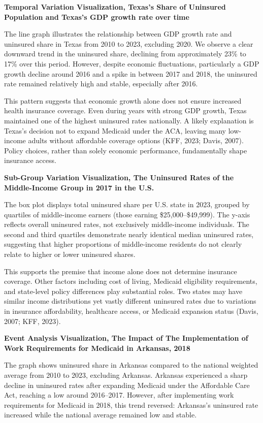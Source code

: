 \documentclass[
]{article}
\begin{document}
\textbf{Temporal Variation Visualization, Texas's Share of Uninsured
Population and Texas's GDP growth rate over time}

The line graph illustrates the relationship between GDP growth rate and
uninsured share in Texas from 2010 to 2023, excluding 2020. We observe a
clear downward trend in the uninsured share, declining from
approximately 23\% to 17\% over this period. However, despite economic
fluctuations, particularly a GDP growth decline around 2016 and a spike
in between 2017 and 2018, the uninsured rate remained relatively high
and stable, especially after 2016.

This pattern suggests that economic growth alone does not ensure
increased health insurance coverage. Even during years with strong GDP
growth, Texas maintained one of the highest uninsured rates nationally.
A likely explanation is Texas's decision not to expand Medicaid under
the ACA, leaving many low-income adults without affordable coverage
options (KFF, 2023; Davis, 2007). Policy choices, rather than solely
economic performance, fundamentally shape insurance access.

\textbf{Sub-Group Variation Visualization, The Uninsured Rates of the
Middle-Income Group in 2017 in the U.S.}

The box plot displays total uninsured share per U.S. state in 2023,
grouped by quartiles of middle-income earners (those earning
\$25,000--\$49,999). The y-axis reflects overall uninsured rates, not
exclusively middle-income individuals. The second and third quartiles
demonstrate nearly identical median uninsured rates, suggesting that
higher proportions of middle-income residents do not clearly relate to
higher or lower uninsured shares.

This supports the premise that income alone does not determine insurance
coverage. Other factors including cost of living, Medicaid eligibility
requirements, and state-level policy differences play substantial roles.
Two states may have similar income distributions yet vastly different
uninsured rates due to variations in insurance affordability, healthcare
access, or Medicaid expansion status (Davis, 2007; KFF, 2023).

\textbf{Event Analysis Visualization, The Impact of The Implementation
of Work Requirements for Medicaid in Arkansas, 2018}

The graph shows uninsured share in Arkansas compared to the national
weighted average from 2010 to 2023, excluding Arkansas. Arkansas
experienced a sharp decline in uninsured rates after expanding Medicaid
under the Affordable Care Act, reaching a low around 2016--2017.
However, after implementing work requirements for Medicaid in 2018, this
trend reversed: Arkansas's uninsured rate increased while the national
average remained low and stable.
\end{document}
